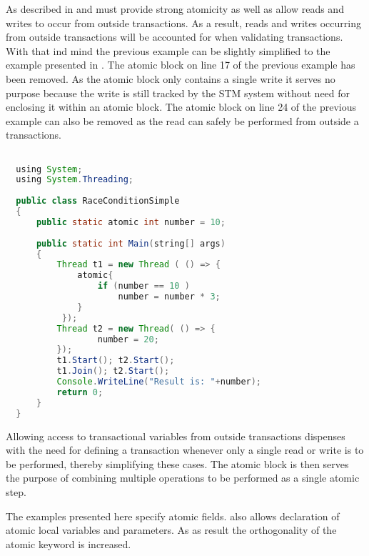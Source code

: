 As described in  and  \stmnamesp must provide strong atomicity as well as allow reads and writes to occur from outside transactions. As a result, reads and writes occurring from outside transactions will be accounted for when validating transactions. With that ind mind the previous example can be slightly simplified to the example presented in . The atomic block on line 17 of the previous example has been removed. As the atomic block only contains a single write it serves no purpose because the write is still tracked by the \ac{STM} system without need for enclosing it within an atomic block. The atomic block on line 24 of the previous example can also be removed as the read can safely be performed from outside a transactions.

\begin{lstlisting}[label=lst:stm_atomic_syntax_simplified,
  caption={Transaction Syntax Simplified},
  language=Java,  
  showspaces=false,
  showtabs=false,
  breaklines=true,
  showstringspaces=false,
  breakatwhitespace=true,
  commentstyle=\color{greencomments},
  keywordstyle=\color{bluekeywords},
  stringstyle=\color{redstrings},
  morekeywords={atomic, retry, orElse, var, get, set, using}]  % Start your code-block

  using System;
  using System.Threading;
  
  public class RaceConditionSimple
  {
      public static atomic int number = 10;
  
      public static int Main(string[] args)
      {
          Thread t1 = new Thread ( () => {
              atomic{
                  if (number == 10 )           
                      number = number * 3;
              }
           });
          Thread t2 = new Thread( () => {
                  number = 20;
          });
          t1.Start(); t2.Start();
          t1.Join(); t2.Start();
          Console.WriteLine("Result is: "+number);
          return 0;
      }
  }
\end{lstlisting}
Allowing access to transactional variables from outside transactions dispenses with the need for defining a transaction whenever only a single read or write is to be performed, thereby simplifying these cases. The atomic block is then serves the purpose of combining multiple operations to be performed as a single atomic step.

The examples presented here specify atomic fields. \stmnamesp also allows declaration of atomic local variables and parameters. As as result the orthogonality of the atomic keyword is increased.

